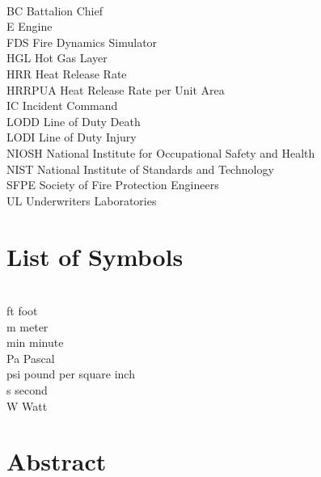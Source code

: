 \documentclass[12pt,oneside]{book}
\begin{document}
\begin{tabbing}
\hspace{1.5in} \= \\
BC \> Battalion Chief \\
E \> Engine \\
FDS \> Fire Dynamics Simulator \\
HGL \> Hot Gas Layer \\
HRR \> Heat Release Rate \\
HRRPUA \> Heat Release Rate per Unit Area \\
IC \> Incident Command \\
LODD \> Line of Duty Death \\
LODI \> Line of Duty Injury \\
NIOSH \> National Institute for Occupational Safety and Health \\
NIST \> National Institute of Standards and Technology \\
SFPE \> Society of Fire Protection Engineers \\
UL \> Underwriters Laboratories
\end{tabbing}

\chapter{List of Symbols}

\begin{tabbing}
\hspace{1.5in} \= \\
ft \> foot \\
m \> meter \\
min \> minute \\
Pa \> Pascal \\
psi \> pound per square inch \\
s \> second \\
W \> Watt \\
\end{tabbing}

\mainmatter


\chapter*{\centering Abstract}
\end{document}
